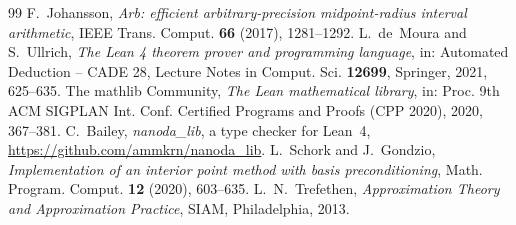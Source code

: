 \documentclass[11pt]{amsart}
\theoremstyle{definition}
\theoremstyle{remark}
\numberwithin{equation}{section}
\begin{document}
\begin{thebibliography}{99}
 F.~Johansson, \emph{Arb: efficient arbitrary-precision midpoint-radius interval arithmetic}, IEEE Trans. Comput. \textbf{66} (2017), 1281--1292.
 L.~de~Moura and S.~Ullrich, \emph{The Lean 4 theorem prover and programming language}, in: Automated Deduction -- CADE 28, Lecture Notes in Comput. Sci. \textbf{12699}, Springer, 2021, 625--635.
 The mathlib Community, \emph{The Lean mathematical library}, in: Proc. 9th ACM SIGPLAN Int. Conf. Certified Programs and Proofs (CPP 2020), 2020, 367--381.
 C.~Bailey, \emph{nanoda\_lib}, a type checker for Lean~4, \url{https://github.com/ammkrn/nanoda_lib}.
 L.~Schork and J.~Gondzio, \emph{Implementation of an interior point method with basis preconditioning}, Math. Program. Comput. \textbf{12} (2020), 603--635.
 L.~N.~Trefethen, \emph{Approximation Theory and Approximation Practice}, SIAM, Philadelphia, 2013.
\end{thebibliography}
\end{document}
